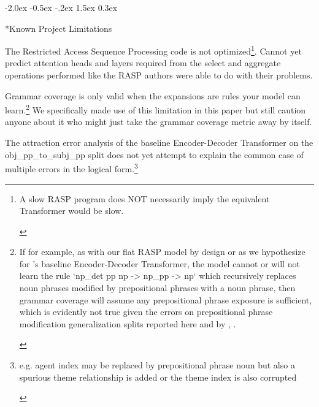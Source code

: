 \documentclass[11pt]{article}
\makeatletter
\renewcommand\section{\@startsection{section}{1}{\z@}%
                                  {-2.0ex \@plus -0.5ex \@minus -.2ex}%
                                  {1.5ex \@plus 0.3ex}%
                                  {\large\bfseries\raggedright}}
\makeatother
\begin{document}
\clearpage
\section*{Known Project Limitations}

The Restricted Access Sequence Processing code is not optimized\footnote{\begin{footnotesize}A slow RASP program does NOT necessarily imply the equivalent Transformer would be slow.\end{footnotesize}}. Cannot yet predict attention heads and layers required from the select and aggregate operations performed like the RASP authors \citep{Weiss2021} were able to do with their problems.

Grammar coverage \citep{fuzzingbook2023:GrammarCoverageFuzzer} is only valid when the expansions are rules your model can learn.\footnote{\begin{footnotesize}If for example, as with our flat RASP model by design or as we hypothesize for \citep{Wu2023}'s baseline Encoder-Decoder Transformer, the model cannot or will not learn the rule `np\_det pp np -> np\_pp -> np` which recursively replaces noun phrases modified by prepositional phrases with a noun phrase, then grammar coverage will assume any prepositional phrase exposure is sufficient, which is evidently not true given the errors on prepositional phrase modification generalization splits reported here and by \citep{Wu2023}, \citep{KimLinzen2020}.
\end{footnotesize}
} We specifically made use of this limitation in this paper but still caution anyone about it who might just take the grammar coverage metric away by itself.

The attraction error analysis of the \citep{Wu2023} baseline Encoder-Decoder Transformer on the obj\_pp\_to\_subj\_pp split does not yet attempt to explain the common case of multiple errors in the logical form.\footnote{\begin{footnotesize}e.g. agent index may be replaced by prepositional phrase noun but also a spurious theme relationship is added or the theme index is also corrupted\end{footnotesize}}
\end{document}
